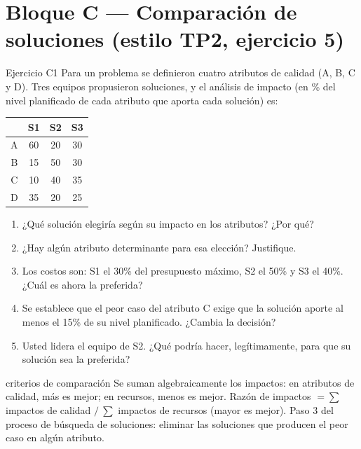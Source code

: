 \documentclass[11pt,a4paper]{article}
\begin{document}
\section{Bloque C --- Comparación de soluciones (estilo TP2, ejercicio 5)}
\begin{enunciado}{Ejercicio C1}
Para un problema se definieron cuatro atributos de calidad (A, B, C y D). Tres equipos propusieron soluciones,
y el análisis de impacto (en \% del nivel planificado de cada atributo que aporta cada solución) es:
\begin{center}
\begin{tabular}{c|ccc}
\toprule
 & S1 & S2 & S3\\
\midrule
A & 60 & 20 & 30\\
B & 15 & 50 & 30\\
C & 10 & 40 & 35\\
D & 35 & 20 & 25\\
\bottomrule
\end{tabular}
\end{center}
\begin{enumerate}[label=\alph*)]
  \item ¿Qué solución elegiría según su impacto en los atributos? ¿Por qué?
  \item ¿Hay algún atributo determinante para esa elección? Justifique.
  \item Los costos son: S1 el 30\% del presupuesto máximo, S2 el 50\% y S3 el 40\%. ¿Cuál es ahora la preferida?
  \item Se establece que el peor caso del atributo C exige que la solución aporte al menos el 15\% de su nivel
  planificado. ¿Cambia la decisión?
  \item Usted lidera el equipo de S2. ¿Qué podría hacer, legítimamente, para que su solución sea la preferida?
\end{enumerate}
\end{enunciado}
\begin{plantilla}{criterios de comparación}
Se suman algebraicamente los impactos: en atributos de calidad, más es mejor; en recursos, menos es mejor.
Razón de impactos $= \sum$ impactos de calidad $/\ \sum$ impactos de recursos (mayor es mejor). Paso 3 del
proceso de búsqueda de soluciones: eliminar las soluciones que producen el peor caso en algún atributo.
\end{plantilla}

\end{document}
